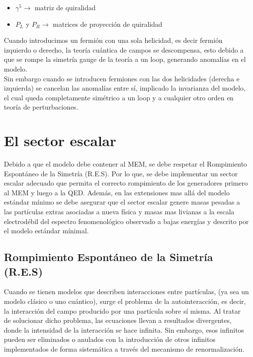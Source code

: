 \documentclass[12pt]{article}
\begin{document}
\begin{itemize}
    \item \(\gamma^{5} \rightarrow \) matriz de quiralidad
    \item \(P_L \) y \(P_R \rightarrow \) matrices de proyección de quiralidad
\end{itemize}


Cuando introducimos un fermión con una sola helicidad, es decir fermión izquierdo o derecho, la teoría cuántica de campos se descompensa, esto debido a que se rompe la simetría gauge de la teoría a un loop, generando anomalías en el modelo. \\

Sin embargo cuando se introducen fermiones con las dos helicidades (derecha e izquierda) se cancelan las anomalías entre sí, implicado la invarianza del modelo, el cual queda  completamente simétrico a un loop y a cualquier otro orden en teoría de perturbaciones. 


\section{El sector escalar}

Debido a que el modelo debe contener al MEM, se debe respetar el Rompimiento Espontáneo de la Simetría (R.E.S). Por lo que, se debe implementar un sector escalar adecuado que permita el correcto rompimiento de los generadores primero al MEM y luego a la QED. Además, en las extensiones mas allá del modelo estándar mínimo se debe asegurar que el sector escalar genere masas pesadas a las partículas extras asociadas a nueva física y masas mas livianas a la escala electrodébil del espectro fenomenológico observado a bajas energías y descrito por el modelo estándar mínimal.  


\subsection{Rompimiento Espontáneo de la Simetría (R.E.S)}

Cuando se tienen modelos que describen interacciones entre partículas, (ya sea un modelo clásico o uno cuántico), surge el problema de la autointeracción, es decir, la interacción del campo producido por una partícula sobre sí misma. Al tratar de solucionar dicho problema, las ecuaciones llevan a resultados divergentes, donde la intensidad de la interacción se hace infinita. Sin embargo, esos infinitos pueden ser eliminados o anulados con la introducción de otros infinitos implementados de forma sistemática a través del mecanismo de renormalización. \\
\end{document}

